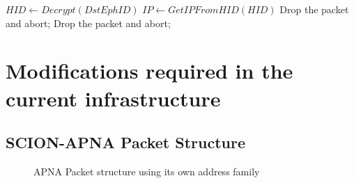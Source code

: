 \begin{algorithmic}
 \STATE $HID \leftarrow Decrypt(DstEphID)$
 \STATE $IP \leftarrow GetIPFromHID(HID)$
 \ELSE
 \STATE Drop the packet and abort; 
 \ENDIF
 \ELSE
 \STATE Drop the packet and abort;
 \ENDIF
\end{algorithmic}

\section{Modifications required in the current infrastructure}
\subsection{SCION-APNA Packet Structure}
\begin{figure}[th!!]
\centering
\noindent
{}
\decoRule
\caption[APNA packet structure using its own address family]{APNA Packet structure  using its own address family}
\label{fig:apna_scion_pkt}
\end{figure}

